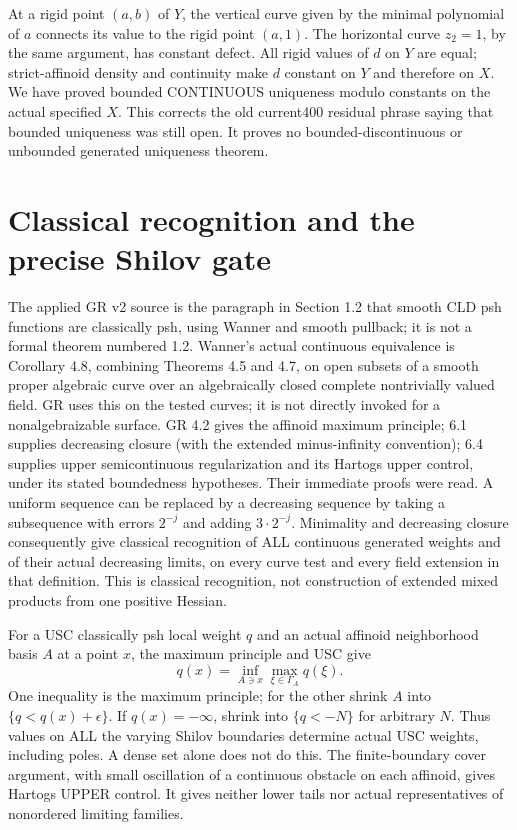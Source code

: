 \documentclass[11pt]{article}
\begin{document}
At a rigid point $(a,b)$ of $Y$, the vertical curve given by the minimal
polynomial of $a$ connects its value to the rigid point $(a,1)$.
The horizontal curve $z_2=1$, by the same argument, has constant defect.
All rigid values of $d$ on $Y$ are equal; strict-affinoid density and continuity
make $d$ constant on $Y$ and therefore on $X$.
We have proved bounded CONTINUOUS uniqueness modulo constants on the actual
specified $X$. This corrects the old current400 residual phrase saying that
bounded uniqueness was still open. It proves no bounded-discontinuous or
unbounded generated uniqueness theorem.

\section{Classical recognition and the precise Shilov gate}
The applied GR v2 source is the paragraph in Section 1.2 that smooth CLD psh
functions are classically psh, using Wanner and smooth pullback; it is not a
formal theorem numbered 1.2. Wanner's actual continuous equivalence is
Corollary 4.8, combining Theorems 4.5 and 4.7, on open subsets of a smooth
proper algebraic curve over an algebraically closed complete nontrivially
valued field. GR uses this on the tested curves; it is not directly invoked
for a nonalgebraizable surface. GR 4.2 gives the affinoid maximum principle;
6.1 supplies decreasing closure (with the extended minus-infinity convention);
6.4 supplies upper semicontinuous regularization and its Hartogs upper control,
under its stated boundedness hypotheses. Their immediate proofs were read.
A uniform sequence can be replaced by a decreasing sequence by taking a
subsequence with errors $2^{-j}$ and adding $3\cdot2^{-j}$.
Minimality and decreasing closure consequently give classical recognition of
ALL continuous generated weights and of their actual decreasing limits,
on every curve test and every field extension in that definition.
This is classical recognition, not construction of extended mixed products
from one positive Hessian.

For a USC classically psh local weight $q$ and an actual affinoid neighborhood
basis $A$ at a point $x$, the maximum principle and USC give
\[
 q(x)=\inf_{A\ni x}\max_{\xi\in\Gamma_A}q(\xi).             \tag{12}
\]
One inequality is the maximum principle; for the other shrink $A$ into
$\{q<q(x)+\epsilon\}$. If $q(x)=-\infty$, shrink into $\{q<-N\}$ for
arbitrary $N$. Thus values on ALL the varying Shilov boundaries determine
actual USC weights, including poles. A dense set alone does not do this.
The finite-boundary cover argument, with small oscillation of a continuous
obstacle on each affinoid, gives Hartogs UPPER control. It gives neither
lower tails nor actual representatives of nonordered limiting families.
\end{document}
